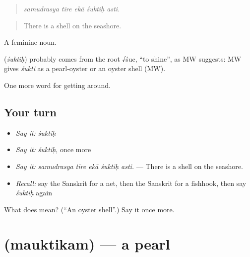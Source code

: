 \begin{quote}
    
\end{quote}

\begin{quote}
\emph{samudrasya tīre ekā śuktiḥ asti.}
\end{quote}

\begin{quote}
There is a shell on the seashore.
\end{quote}

A feminine noun.

\begin{cousinweb}
\textbf{} (\emph{śuktiḥ}) probably comes from the root √śuc, \textquotedblleft{}to shine\textquotedblright{}, as MW suggests: MW gives \emph{śukti} as a pearl-oyster or an oyster shell (MW).
\end{cousinweb}

\begin{grammarlens}[title={What you've built}]
One more word for getting around.
\end{grammarlens}

\subsection*{Your turn}
\begin{itemize}
\raggedright
  \item \emph{Say it:} \emph{śuktiḥ}
  \item \emph{Say it:} \emph{śuktiḥ}, once more
  \item \emph{Say it:} \emph{samudrasya tīre ekā śuktiḥ asti.} — There is a shell on the seashore.
  \item \emph{Recall:} say the Sanskrit for a net, then the Sanskrit for a fishhook, then say \emph{śuktiḥ} again
\end{itemize}

\begin{tcolorbox}[breakable,colback=teal!4,colframe=teal!35!black,title={Before you move on}]
What does  mean? (\textquotedblleft{}An oyster shell\textquotedblright{}.) Say it once more.
\end{tcolorbox}
\section[\texorpdfstring{\sk{मौक्तिकम्} (mauktikam)}{मौक्तिकम् (mauktikam)}]{ (mauktikam) — a pearl}

